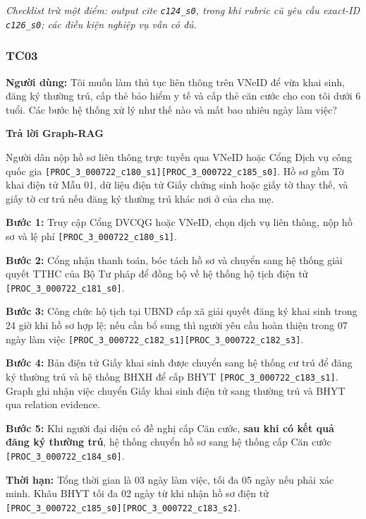 \documentclass[11pt,a4paper]{article}
\newcommand{\src}[1]{\texttt{#1}}
\begin{document}
\textit{Checklist trừ một điểm: output cite \src{c124\_s0}, trong khi rubric cũ yêu cầu exact-ID \src{c126\_s0}; các điều kiện nghiệp vụ vẫn có đủ.}

\subsubsection*{TC03}
\begin{questionbox}
\textbf{Người dùng:} Tôi muốn làm thủ tục liên thông trên VNeID để vừa khai sinh, đăng ký thường trú, cấp thẻ bảo hiểm y tế và cấp thẻ căn cước cho con tôi dưới 6 tuổi. Các bước hệ thống xử lý như thế nào và mất bao nhiêu ngày làm việc?
\end{questionbox}

\textbf{Trả lời Graph-RAG}\par\nobreak
\begin{answerbox}
Người dân nộp hồ sơ liên thông trực tuyến qua VNeID hoặc Cổng Dịch vụ công quốc gia \src{[PROC\_3\_000722\_c180\_s1][PROC\_3\_000722\_c185\_s0]}. Hồ sơ gồm Tờ khai điện tử Mẫu 01, dữ liệu điện tử Giấy chứng sinh hoặc giấy tờ thay thế, và giấy tờ cư trú nếu đăng ký thường trú khác nơi ở của cha mẹ.

\textbf{Bước 1:} Truy cập Cổng DVCQG hoặc VNeID, chọn dịch vụ liên thông, nộp hồ sơ và lệ phí \src{[PROC\_3\_000722\_c180\_s1]}.

\textbf{Bước 2:} Cổng nhận thanh toán, bóc tách hồ sơ và chuyển sang hệ thống giải quyết TTHC của Bộ Tư pháp để đồng bộ về hệ thống hộ tịch điện tử \src{[PROC\_3\_000722\_c181\_s0]}.

\textbf{Bước 3:} Công chức hộ tịch tại UBND cấp xã giải quyết đăng ký khai sinh trong 24 giờ khi hồ sơ hợp lệ; nếu cần bổ sung thì người yêu cầu hoàn thiện trong 07 ngày làm việc \src{[PROC\_3\_000722\_c182\_s1][PROC\_3\_000722\_c182\_s3]}.

\textbf{Bước 4:} Bản điện tử Giấy khai sinh được chuyển sang hệ thống cư trú để đăng ký thường trú và hệ thống BHXH để cấp BHYT \src{[PROC\_3\_000722\_c183\_s1]}. Graph ghi nhận việc chuyển Giấy khai sinh điện tử sang thường trú và BHYT qua relation evidence.

\textbf{Bước 5:} Khi người đại diện có đề nghị cấp Căn cước, \textbf{sau khi có kết quả đăng ký thường trú}, hệ thống chuyển hồ sơ sang hệ thống cấp Căn cước \src{[PROC\_3\_000722\_c184\_s0]}.

\textbf{Thời hạn:} Tổng thời gian là 03 ngày làm việc, tối đa 05 ngày nếu phải xác minh. Khâu BHYT tối đa 02 ngày từ khi nhận hồ sơ điện tử \src{[PROC\_3\_000722\_c185\_s0][PROC\_3\_000722\_c183\_s2]}.
\end{answerbox}
\end{document}
